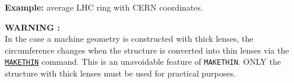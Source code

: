 {\bf Example:} average LHC ring with CERN coordinates.


{\bf WARNING :}\\
In the case a machine geometry is constructed with thick lenses, the
circumference changes when the structure is converted into thin lenses
via the \hyperref[chap:makethin]{\tt MAKETHIN} command. This is an
unavoidable feature of {\tt MAKETHIN}. ONLY the structure with thick
lenses must be used for practical purposes.





